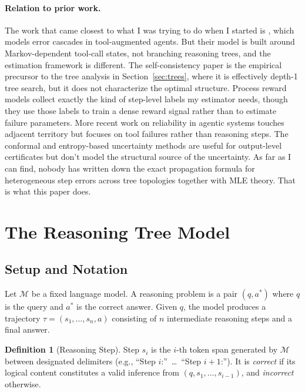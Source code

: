 \documentclass[11pt]{article}
\theoremstyle{plain}
\theoremstyle{definition}
\newtheorem{definition}[theorem]{Definition}
\newcommand{\llm}{\mathcal{M}}
\begin{document}
\paragraph{Relation to prior work.}
The work that came closest to what I was trying to do when I started is
\citet{li2024cascade}, which models error cascades in tool-augmented agents. But
their model is built around Markov-dependent tool-call states, not branching
reasoning trees, and the estimation framework is different. The self-consistency
paper \citep{wang2022self} is the empirical precursor to the tree analysis in
Section~\ref{sec:trees}, where it is effectively depth-1 tree search, but it does
not characterize the optimal structure. Process reward models
\citep{lightman2023let} collect exactly the kind of step-level labels my
estimator needs, though they use those labels to train a dense reward signal
rather than to estimate failure parameters. More recent work on reliability in
agentic systems \citep{zhao2024reliability} touches adjacent territory but
focuses on tool failures rather than reasoning steps. The conformal and
entropy-based uncertainty methods \citep{angelopoulos2023conformal,
kuhn2023semantic} are useful for output-level certificates but don't model
the structural source of the uncertainty. As far as I can find, nobody has
written down the exact propagation formula for heterogeneous step errors across
tree topologies together with MLE theory. That is what this paper does.

\section{The Reasoning Tree Model}
\label{sec:model}

\subsection{Setup and Notation}

Let $\llm$ be a fixed language model. A reasoning problem is a pair $(q, a^*)$
where $q$ is the query and $a^*$ is the correct answer. Given $q$, the model
produces a trajectory $\tau = (s_1, \ldots, s_n, a)$ consisting of $n$
intermediate reasoning steps and a final answer.

\begin{definition}[Reasoning Step]\label{def:step}
  Step $s_i$ is the $i$-th token span generated by $\llm$ between designated
  delimiters (e.g., ``Step $i$:''\ \ldots\ ``Step $i{+}1$:''). It is
  \emph{correct} if its logical content constitutes a valid inference from
  $(q, s_1, \ldots, s_{i-1})$, and \emph{incorrect} otherwise.
\end{definition}
\end{document}

